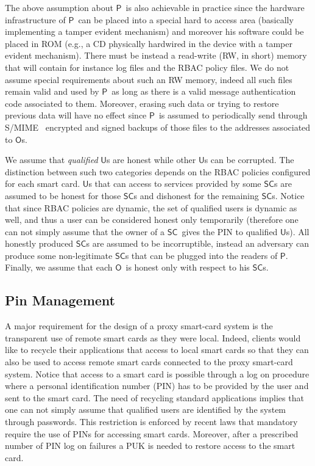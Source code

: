 \documentclass{sig-alternate}
\newcommand{\Owner}{\ensuremath{\mathsf{O}}}
\newcommand{\User}{\ensuremath{\mathsf{U}}}
\newcommand{\Proxy}{\ensuremath{\mathsf{P}}}
\newcommand{\SC}{\ensuremath{\mathsf{SC}}}
\begin{document}
The above assumption about \Proxy\ is also achievable in practice since the hardware infrastructure of \Proxy\ can be placed into a special hard to access area (basically implementing a tamper evident mechanism) and moreover his software could be placed in ROM (e.g., a CD physically hardwired in the device with a tamper evident mechanism). There must be instead a read-write (RW, in short) memory that will contain for instance log files and the RBAC policy files. We do not assume special requirements about such an RW memory, indeed all such files remain valid and used by \Proxy\ as long as there is a valid message authentication code associated
to them. Moreover, erasing such data or trying to restore previous data will have no effect since \Proxy\ is assumed to periodically send through S/MIME~\cite{smime} encrypted and signed backups of those files to the addresses associated to \Owner s.

We assume that {\em qualified} \User s are honest while other \User s can be corrupted. The distinction between such two categories depends on the RBAC policies configured for each smart card. \User s that can access to services provided by some \SC s are assumed to be honest for those \SC s and dishonest for the remaining \SC s. Notice that since RBAC policies are dynamic, the set of qualified users is dynamic as well, and thus a user can be considered honest only temporarily (therefore one can not simply assume that the owner of a \SC\ gives the PIN to qualified \User s).
All honestly produced \SC s are assumed to be incorruptible, instead an adversary can produce some non-legitimate \SC s that can be plugged into the readers of \Proxy.
Finally, we assume that each \Owner\ is honest only with respect to his \SC s.

\subsection{Pin Management}
A major requirement for the design of a proxy smart-card system is the transparent use of remote smart cards as they were local. Indeed, clients would like to recycle their applications that access to local smart cards so that they can also be used to access remote smart cards connected to the proxy smart-card system. Notice that access to
a smart card is possible through a log on procedure where a personal identification number (PIN) has to be provided by the user and sent to the smart card. The need of recycling standard applications implies that one can not simply assume that qualified users are identified by the system through passwords. This restriction is enforced by recent laws that mandatory require the use of PINs for accessing smart cards.
Moreover, after  a prescribed number of PIN log on failures a PUK is needed to restore access to the smart card.
\end{document}
